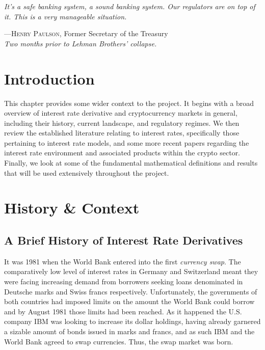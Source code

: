 \epigraph{\textit{It's a safe banking system, a sound banking system. Our regulators are on top of it. This is a very manageable situation.}}{––\textsc{Henry Paulson}, Former Secretary of the Treasury \\ \textit{Two months prior to Lehman Brothers' collapse.}}


\section{Introduction}
This chapter provides some wider context to the project. It begins with a broad overview of interest rate derivative and cryptocurrency markets in general, including their history, current landscape, and regulatory regimes. We then review the established literature relating to interest rates, specifically those pertaining to interest rate models, and some more recent papers regarding the interest rate environment and associated products within the crypto sector. Finally, we look at some of the fundamental mathematical definitions and results that will be used extensively throughout the project. 

\section{History \& Context}

\subsection{A Brief History of Interest Rate Derivatives}
It was 1981 when the World Bank entered into the first \textit{currency swap}. The comparatively low level of interest rates in Germany and Switzerland meant they were facing increasing demand from borrowers seeking loans denominated in Deutsche marks and Swiss francs respectively. Unfortunately, the governments of both countries had imposed limits on the amount the World Bank could borrow and by August 1981 those limits had been reached. As it happened the U.S. company IBM was looking to increase its dollar holdings, having already garnered a sizable amount of bonds issued in marks and francs, and as such IBM and the World Bank agreed to swap currencies. Thus, the swap market was born. 

